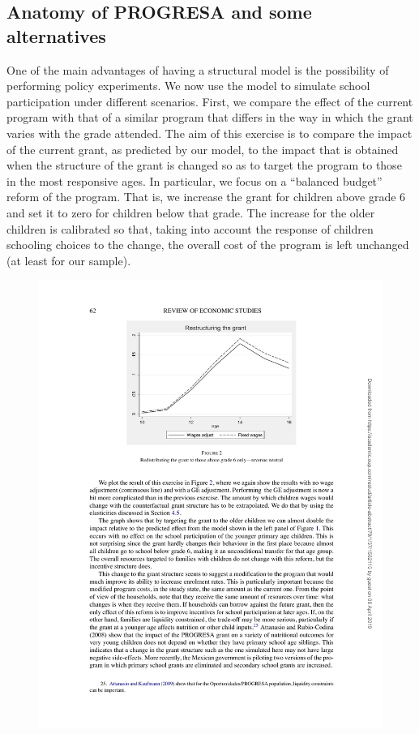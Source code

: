 \documentclass{handoutForSolutions}
\begin{document}
\subsection{Anatomy of PROGRESA and some alternatives}
One of the main advantages of having a structural model is the possibility of performing policy experiments. We now use the model to simulate school participation under different scenarios. First, we compare the effect of the current program with that of a similar program that differs in the way in which the grant varies with the grade attended.
The aim of this exercise is to compare the impact of the current grant, as predicted by our model, to the impact that is obtained when the structure of the grant is changed so as to target the program to those in the most responsive ages. In particular, we focus on a ``balanced budget'' reform of the program. That is, we increase the grant for children above grade 6 and set it to zero for children below that grade. The increase for the older children is calibrated so that, taking into account the response of children schooling choices to the change, the overall cost of the program is left unchanged (at least for our sample).
\begin{figure}[H]
\centering
\includegraphics[width=0.75\linewidth]{image/AttanasioMeghir Santiago2011Figure7.pdf}
\end{figure}
\end{document}
